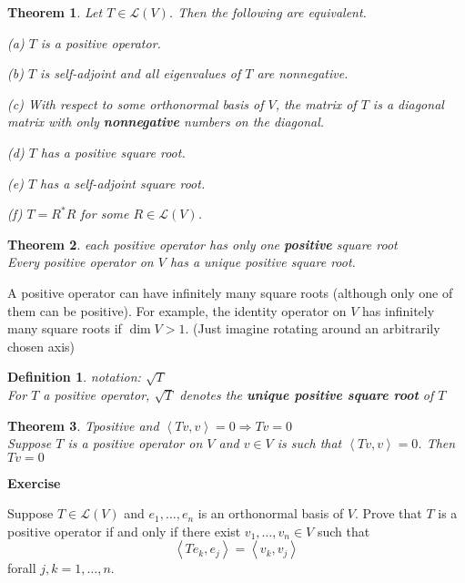 \documentclass{article}
\newtheorem{theorem}{Theorem}[subsection]
\newtheorem{definition}{Definition}[subsection]
\newenvironment{exercise}{%
{\textbf{Exercise\\}
    }
}{
}
\begin{document}
\begin{CJK}{UTF8}{gkai}
\begin{theorem}
    Let $T \in \mathcal{L}(V)$. Then the following are equivalent.

    (a) $T$ is a positive operator.

    (b) $T$ is self-adjoint and all eigenvalues of $T$ are nonnegative.
 
    (c) With respect to some orthonormal basis of $V$, the matrix of $T$ is a diagonal matrix with only \textbf{nonnegative} numbers on the diagonal.
 
    (d) $T$ has a positive square root.

    (e) $T$ has a self-adjoint square root.

    (f) $T = R^\ast R$ for some $R \in \mathcal{L}(V)$.
\end{theorem}

\begin{theorem}
    each positive operator has only one \textbf{positive} square root\\

    Every positive operator on $V$ has a unique positive square root.
\end{theorem}

A positive operator can have infinitely many square roots (although only one of them can be positive). For example, the identity operator on $V$ has infinitely many square roots if $\dim V > 1$. (Just imagine rotating around an arbitrarily chosen axis)

\begin{definition}
    notation: $\sqrt{T}$\\

    For $T$ a positive operator, $\sqrt{T}$ denotes the \textbf{unique positive square root} of $T$
\end{definition}

\begin{theorem}
    Tpositive and $\left<Tv,v\right> = 0 \Rightarrow Tv = 0$\\

    Suppose $T$ is a positive operator on $V$ and $v \in V$ is such that $\left<Tv,v\right> = 0$. Then $Tv = 0$
\end{theorem}

\begin{exercise}
    Suppose $T\in\mathcal{L}(V)$ and $e_1,\ldots,e_n$ is an orthonormal basis of $V$. Prove that $T$ is a positive operator if and only if there exist $v_1,\ldots,v_n \in V$ such that
    \[\left<Te_k,e_j\right> = \left<v_k,v_j\right>\]
    forall $j,k=1,\ldots,n$.


\end{exercise}
\end{CJK}
\end{document}
